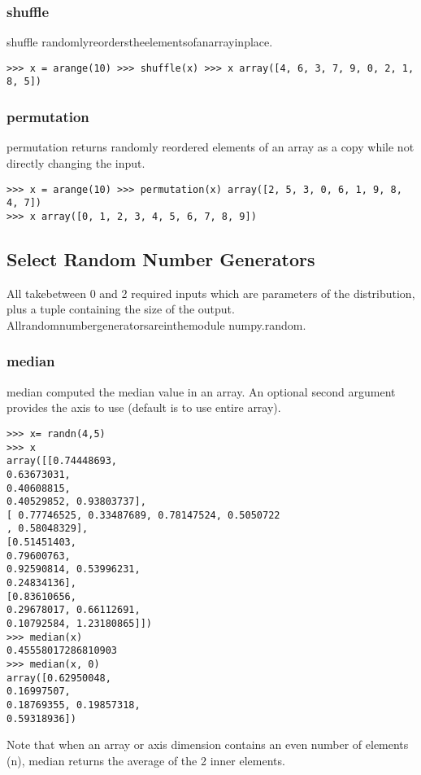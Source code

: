 \documentclass[KSmain.tex]{subfiles}
\begin{document}
\subsubsection{shuffle}
shuffle randomlyreorderstheelementsofanarrayinplace.
\begin{verbatim}
>>> x = arange(10) >>> shuffle(x) >>> x array([4, 6, 3, 7, 9, 0, 2, 1, 8, 5])
\end{verbatim}
\subsubsection{permutation}
permutation returns randomly reordered elements of an array as a copy while not directly changing the input.
\begin{framed}
\begin{verbatim}
>>> x = arange(10) >>> permutation(x) array([2, 5, 3, 0, 6, 1, 9, 8, 4, 7])
>>> x array([0, 1, 2, 3, 4, 5, 6, 7, 8, 9])
\end{verbatim}
\end{framed}
\subsection{Select Random Number Generators}

All takebetween 0 and 2 required inputs which are parameters of the distribution, plus a tuple containing the size of the output. Allrandomnumbergeneratorsareinthemodule 
numpy.random.







\subsubsection{median}
median computed the median value in an array. An optional second argument provides the axis to use
(default is to use entire array).
\begin{verbatim}
>>> x= randn(4,5)
>>> x
array([[0.74448693,
0.63673031,
0.40608815,
0.40529852, 0.93803737],
[ 0.77746525, 0.33487689, 0.78147524, 0.5050722
, 0.58048329],
[0.51451403,
0.79600763,
0.92590814, 0.53996231,
0.24834136],
[0.83610656,
0.29678017, 0.66112691,
0.10792584, 1.23180865]])
>>> median(x)
0.45558017286810903
>>> median(x, 0)
array([0.62950048,
0.16997507,
0.18769355, 0.19857318,
0.59318936])
\end{verbatim}
Note that when an array or axis dimension contains an even number of elements (n), median returns the
average of the 2 inner elements.
\end{document}
